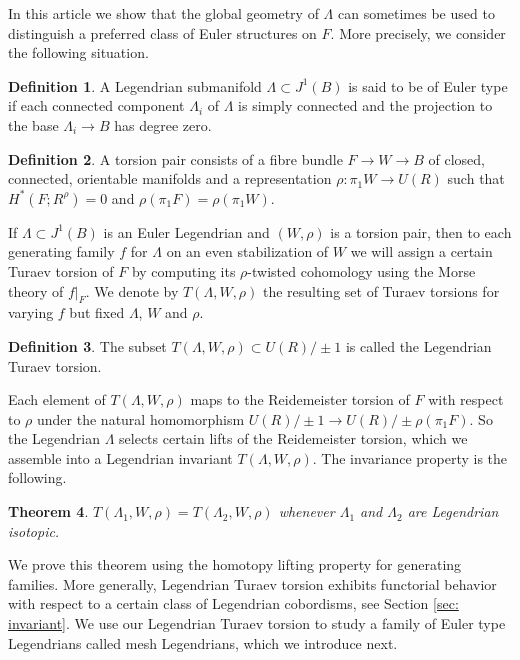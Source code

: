 \documentclass[JEP,XML,SOM,Unicode,NoFloatCountersInSection]{cedram}
\theoremstyle{plain}
\newtheorem{theorem}{Theorem}[section]
\theoremstyle{definition}
\newtheorem{definition}[theorem]{Definition}
\begin{document}
In this article we show that the global geometry of
$\Lambda$ can sometimes be used to distinguish a preferred class of Euler structures on $F$. More precisely, we consider the following situation.

\begin{definition}
A Legendrian submanifold $\Lambda \subset J^1(B)$ is said to be of Euler type if each connected component $\Lambda_i$ of $\Lambda$ is simply connected and the projection to the base $\Lambda_i \to B$ has degree zero.
\end{definition}

\begin{definition}
A torsion pair consists of a fibre bundle $F \to W \to B$ of closed, connected, orientable manifolds and a representation $\rho:\pi_1W \to U(R)$ such that $H^*(F;R^\rho)=0$ and $\rho(\pi_1F)=\rho(\pi_1W)$.
\end{definition}

If $\Lambda \subset J^1(B)$ is an Euler Legendrian and $(W,\rho)$ is a torsion pair, then to each generating family $f$ for $\Lambda$ on an even stabilization of $W$ we will assign a certain Turaev torsion of $F$ by computing its $\rho$-twisted cohomology using the Morse theory of $f|_F$. We denote by $T(\Lambda, W, \rho)$ the resulting set of Turaev torsions for varying $f$ but fixed $\Lambda$, $W$ and $\rho$.

\begin{definition} The subset $T(\Lambda, W, \rho) \subset U(R) / \pm1$ is called the Legendrian Turaev torsion. \end{definition}

Each element of $T(\Lambda,W,\rho)$ maps to the Reidemeister torsion of $F$ with respect to $\rho$ under the natural homomorphism $U(R) / \pm 1 \to U(R) / \pm \rho(\pi_1 F)$. So the Legendrian $\Lambda$ selects certain lifts of the Reidemeister torsion, which we assemble into a Legendrian invariant $T(\Lambda, W, \rho)$. The invariance property is the following.
\begin{theorem} $T(\Lambda_1,W,\rho)=T(\Lambda_2, W, \rho)$ whenever $\Lambda_1$ and $\Lambda_2$ are Legendrian isotopic.
\end{theorem}
We prove this theorem using the homotopy lifting property for generating families. More generally, Legendrian Turaev torsion exhibits functorial behavior with respect to a certain class of Legendrian cobordisms, see Section \ref{sec: invariant}. We use our Legendrian Turaev torsion to study a family of Euler type Legendrians called mesh Legendrians, which we introduce next.
\end{document}
